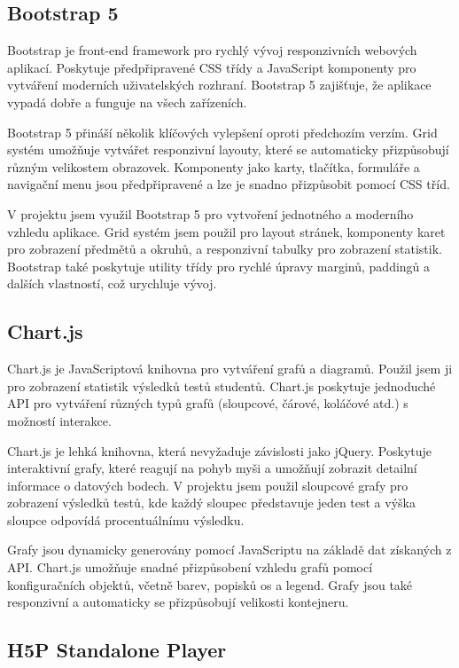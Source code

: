 \documentclass[a4paper,12pt]{article}
\begin{document}
\subsection{Bootstrap 5}

Bootstrap je front-end framework pro rychlý vývoj responzivních webových aplikací. Poskytuje předpřipravené CSS třídy a JavaScript komponenty pro vytváření moderních uživatelských rozhraní. Bootstrap 5 zajišťuje, že aplikace vypadá dobře a funguje na všech zařízeních.

Bootstrap 5 přináší několik klíčových vylepšení oproti předchozím verzím. Grid systém umožňuje vytvářet responzivní layouty, které se automaticky přizpůsobují různým velikostem obrazovek. Komponenty jako karty, tlačítka, formuláře a navigační menu jsou předpřipravené a lze je snadno přizpůsobit pomocí CSS tříd.

V projektu jsem využil Bootstrap 5 pro vytvoření jednotného a moderního vzhledu aplikace. Grid systém jsem použil pro layout stránek, komponenty karet pro zobrazení předmětů a okruhů, a responzivní tabulky pro zobrazení statistik. Bootstrap také poskytuje utility třídy pro rychlé úpravy marginů, paddingů a dalších vlastností, což urychluje vývoj.

\subsection{Chart.js}

Chart.js je JavaScriptová knihovna pro vytváření grafů a diagramů. Použil jsem ji pro zobrazení statistik výsledků testů studentů. Chart.js poskytuje jednoduché API pro vytváření různých typů grafů (sloupcové, čárové, koláčové atd.) s možností interakce.

Chart.js je lehká knihovna, která nevyžaduje závislosti jako jQuery. Poskytuje interaktivní grafy, které reagují na pohyb myši a umožňují zobrazit detailní informace o datových bodech. V projektu jsem použil sloupcové grafy pro zobrazení výsledků testů, kde každý sloupec představuje jeden test a výška sloupce odpovídá procentuálnímu výsledku.

Grafy jsou dynamicky generovány pomocí JavaScriptu na základě dat získaných z API. Chart.js umožňuje snadné přizpůsobení vzhledu grafů pomocí konfiguračních objektů, včetně barev, popisků os a legend. Grafy jsou také responzivní a automaticky se přizpůsobují velikosti kontejneru.

\newpage

\subsection{H5P Standalone Player}
\end{document}
